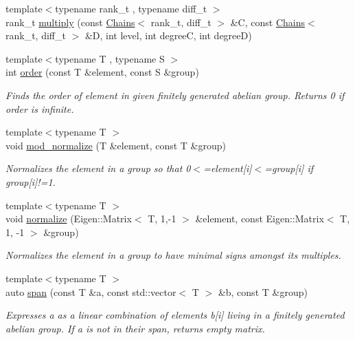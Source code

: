 \begin{DoxyCompactItemize}
\item 
{\footnotesize template$<$typename rank\+\_\+t , typename diff\+\_\+t $>$ }\\rank\+\_\+t \hyperlink{namespaceMackey_a2eca4cc709501ad3fc20b82fe4bcbd33}{multiply} (const \hyperlink{classMackey_1_1Chains}{Chains}$<$ rank\+\_\+t, diff\+\_\+t $>$ \&C, const \hyperlink{classMackey_1_1Chains}{Chains}$<$ rank\+\_\+t, diff\+\_\+t $>$ \&D, int level, int degreeC, int degreeD)
\item 
{\footnotesize template$<$typename T , typename S $>$ }\\int \hyperlink{namespaceMackey_a4abdca157edcf425b1e7ceff39d74c2f}{order} (const T \&element, const S \&group)
\begin{DoxyCompactList}\small\item\em Finds the order of element in given finitely generated abelian group. Returns 0 if order is infinite. \end{DoxyCompactList}\item 
{\footnotesize template$<$typename T $>$ }\\void \hyperlink{namespaceMackey_a257bcf5aabab2d73fdb13a23cb975d93}{mod\+\_\+normalize} (T \&element, const T \&group)
\begin{DoxyCompactList}\small\item\em Normalizes the element in a group so that 0$<$=element\mbox{[}i\mbox{]}$<$=group\mbox{[}i\mbox{]} if group\mbox{[}i\mbox{]}!=1. \end{DoxyCompactList}\item 
{\footnotesize template$<$typename T $>$ }\\void \hyperlink{namespaceMackey_a635c87980358b97256fe159f0c59bb80}{normalize} (Eigen\+::\+Matrix$<$ T, 1,-\/1 $>$ \&element, const Eigen\+::\+Matrix$<$ T, 1, -\/1 $>$ \&group)
\begin{DoxyCompactList}\small\item\em Normalizes the element in a group to have minimal signs amongst its multiples. \end{DoxyCompactList}\item 
{\footnotesize template$<$typename T $>$ }\\auto \hyperlink{namespaceMackey_a1b3e66989e89c8b97d113d8eec0b47b8}{span} (const T \&a, const std\+::vector$<$ T $>$ \&b, const T \&group)
\begin{DoxyCompactList}\small\item\em Expresses a as a linear combination of elements b\mbox{[}i\mbox{]} living in a finitely generated abelian group. If a is not in their span, returns empty matrix. \end{DoxyCompactList}\item 

\end{DoxyCompactItemize}
